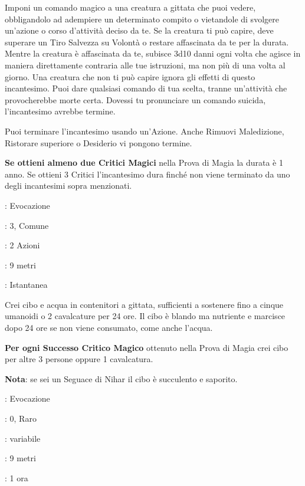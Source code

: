 \begin{multicols}{2}
Imponi un comando magico a una creatura a gittata che puoi vedere, obbligandolo ad adempiere un determinato compito o vietandole di svolgere un'azione o corso d'attività deciso da te. Se la creatura ti può capire, deve superare un Tiro Salvezza su Volontà o restare affascinata da te per la durata. Mentre la creatura è affascinata da te, subisce 3d10 danni ogni volta che agisce in maniera direttamente contraria alle tue istruzioni, ma non più di una volta al giorno. Una creatura che non ti può capire ignora gli effetti di questo incantesimo. Puoi dare qualsiasi comando di tua scelta, tranne un'attività che provocherebbe morte certa. Dovessi tu pronunciare un comando suicida, l'incantesimo avrebbe termine.

Puoi terminare l'incantesimo usando un'Azione. Anche Rimuovi Maledizione, Ristorare superiore o Desiderio vi pongono termine.

\textbf{Se ottieni almeno due Critici Magici} nella Prova di Magia la durata è 1 anno. Se ottieni 3 Critici l'incantesimo dura finché non viene terminato da uno degli incantesimi sopra menzionati.

\noindent\colorbox{OBSSgold!10}{
\begin{minipage}{0.95\linewidth}
\begin{description}[noitemsep, topsep=0pt, parsep=0pt, partopsep=0pt, leftmargin=0cm, labelwidth=1.3cm]
	\item[\textbf{Lista}]: Evocazione
	\item[\textbf{Livello}]: 3, Comune
	\item[\textbf{Lancio}]: 2 Azioni
	\item[\textbf{Gittata}]: 9 metri
	\item[\textbf{Durata}]: Istantanea
\end{description}
\end{minipage}}\smallskip

Crei cibo e acqua in contenitori a gittata, sufficienti a sostenere fino a cinque umanoidi o 2 cavalcature per 24 ore. Il cibo è blando ma nutriente e marcisce dopo 24 ore se non viene consumato, come anche l'acqua.

\textbf{Per ogni Successo Critico Magico} ottenuto nella Prova di Magia crei cibo per altre 3 persone oppure 1 cavalcatura.

\textbf{Nota}: se sei un Seguace di Nihar il cibo è succulento e saporito.

\noindent\colorbox{OBSSgold!10}{
\begin{minipage}{0.95\linewidth}
\begin{description}[noitemsep, topsep=0pt, parsep=0pt, partopsep=0pt, leftmargin=0cm, labelwidth=1.3cm]
	\item[\textbf{Lista}]: Evocazione
	\item[\textbf{Livello}]: 0, Raro
	\item[\textbf{Lancio}]: variabile
	\item[\textbf{Gittata}]: 9 metri
	\item[\textbf{Durata}]: 1 ora
\end{description}
\end{minipage}}\smallskip


\end{multicols}
